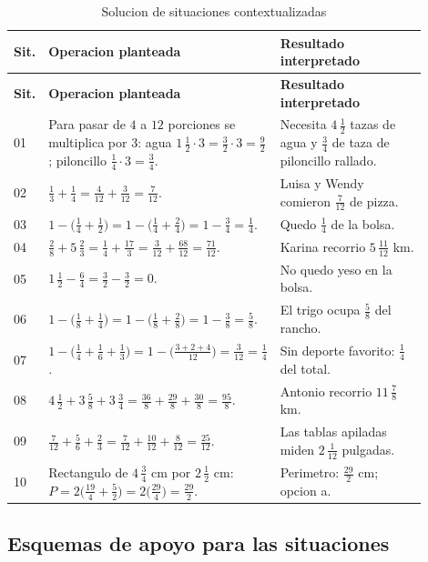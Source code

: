 \documentclass[
	spanish,
	letterpaper, oneside
]{article}
\begin{document}
\begin{longtable}{@{}p{0.08\linewidth}p{0.42\linewidth}p{0.40\linewidth}@{}}
	\caption{Solucion de situaciones contextualizadas}\label{tab:situaciones-contexto}\\
	\toprule
	\textbf{Sit.} & \textbf{Operacion planteada} & \textbf{Resultado interpretado} \\
	\midrule
	\endfirsthead
	\toprule
	\textbf{Sit.} & \textbf{Operacion planteada} & \textbf{Resultado interpretado} \\
	\midrule
	\endhead
	01 & Para pasar de $4$ a $12$ porciones se multiplica por $3$: agua $1\,\frac{1}{2}\cdot3=\frac{3}{2}\cdot3=\frac{9}{2}$; piloncillo $\frac14\cdot3=\frac34$. & Necesita $4\,\frac12$ tazas de agua y $\frac34$ de taza de piloncillo rallado. \\
	02 & $\frac13+\frac14=\frac{4}{12}+\frac{3}{12}=\frac{7}{12}$. & Luisa y Wendy comieron $\frac{7}{12}$ de pizza. \\
	03 & $1-\bigl(\frac14+\frac12\bigr)=1-\bigl(\frac14+\frac24\bigr)=1-\frac34=\frac14$. & Quedo $\frac14$ de la bolsa. \\
	04 & $\frac{2}{8}+5\,\frac23=\frac14+\frac{17}{3}=\frac{3}{12}+\frac{68}{12}=\frac{71}{12}$. & Karina recorrio $5\,\frac{11}{12}$ km. \\
	05 & $1\,\frac12-\frac64=\frac32-\frac32=0$. & No quedo yeso en la bolsa. \\
	06 & $1-\bigl(\frac18+\frac14\bigr)=1-\bigl(\frac18+\frac28\bigr)=1-\frac38=\frac58$. & El trigo ocupa $\frac58$ del rancho. \\
	07 & $1-\bigl(\frac14+\frac16+\frac13\bigr)=1-\bigl(\frac{3+2+4}{12}\bigr)=\frac{3}{12}=\frac14$. & Sin deporte favorito: $\frac14$ del total. \\
	08 & $4\,\frac12+3\,\frac58+3\,\frac34=\frac{36}{8}+\frac{29}{8}+\frac{30}{8}=\frac{95}{8}$. & Antonio recorrio $11\,\frac78$ km. \\
	09 & $\frac{7}{12}+\frac56+\frac23=\frac{7}{12}+\frac{10}{12}+\frac{8}{12}=\frac{25}{12}$. & Las tablas apiladas miden $2\,\frac{1}{12}$ pulgadas. \\
	10 & Rectangulo de $4\,\frac34$ cm por $2\,\frac12$ cm: $P=2\biggl(\frac{19}{4}+\frac{5}{2}\biggr)=2\biggl(\frac{29}{4}\biggr)=\frac{29}{2}$. & Perimetro: $\frac{29}{2}$ cm; opcion a. \\
	\bottomrule
\end{longtable}

\subsection{Esquemas de apoyo para las situaciones}
\end{document}
